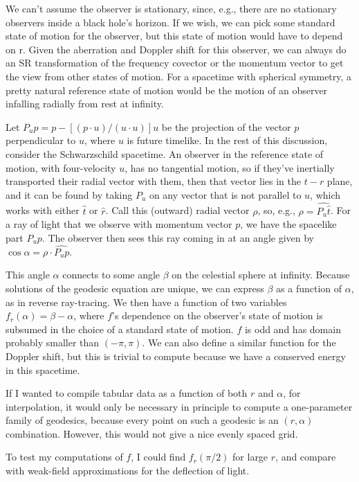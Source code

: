 \documentclass{article}
\begin{document}
We can't assume the observer is stationary, since, e.g., there are no stationary observers inside a
black hole's horizon. If we wish, we can pick some standard state of motion for the observer, but this state
of motion would have to depend on r. Given the aberration and Doppler shift for this observer,
we can always do an SR transformation of the frequency covector or the momentum vector to get
the view from other states of motion. For a spacetime with spherical symmetry,
a pretty natural reference state of motion would be
the motion of an observer infalling radially from rest at infinity.

Let $P_u p=p-[(p\cdot u)/(u\cdot u)]u$ be the projection of the vector $p$ perpendicular to $u$,
where $u$ is future timelike. In the rest of this discussion, consider the Schwarzschild spacetime.
An observer in the reference state of motion, with four-velocity $u$,
has no tangential motion, so if they've inertially transported their radial vector with them, then
that vector lies in the $t-r$ plane, and it can be found by taking $P_u$ on any vector that is not
parallel to $u$, which works with either $\hat{t}$ or $\hat{r}$. Call this (outward) radial
vector $\rho$, so, e.g.,
$\rho=\widehat{P_u\hat{t}}$. For a ray of light that we observe with momentum vector $p$, we have
the spacelike part $P_u p$. The observer then sees this ray coming in at an angle given by
$\cos\alpha=\rho \cdot \widehat{P_u p}$.

This angle $\alpha$ connects to some angle $\beta$ on the celestial
sphere at infinity. Because solutions of the geodesic equation are
unique, we can express $\beta$ as a function of $\alpha$, as in
reverse ray-tracing. We then have a function of two variables
$f_r(\alpha)=\beta-\alpha$, where $f$'s dependence on the observer's
state of motion is subsumed in the choice of a standard state of
motion. $f$ is odd and has domain probably smaller than $(-\pi,\pi)$. We can
also define a similar function for the Doppler shift, but this is trivial
to compute because we have a conserved energy in this spacetime.

If I wanted to compile tabular data as a function of both $r$ and $\alpha$,
for interpolation, it would only be necessary in principle to compute a
one-parameter family of geodesics, because every point on such a geodesic
is an $(r,\alpha)$ combination. However, this would not give a nice evenly spaced
grid.

To test my computations of $f$, I could find $f_r(\pi/2)$ for large $r$, and
compare with weak-field approximations for the deflection of light.
\end{document}
